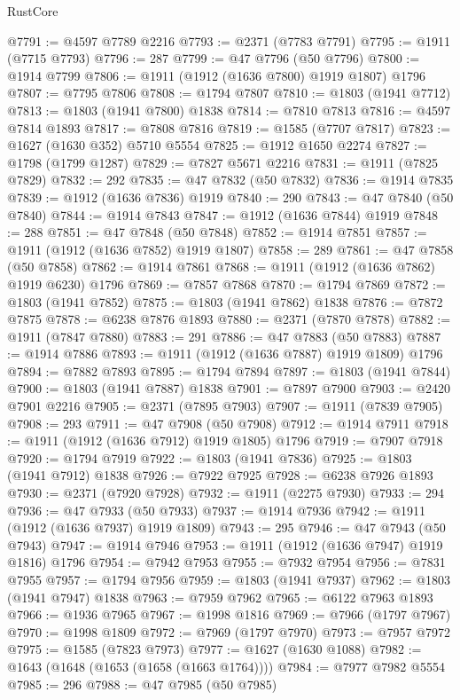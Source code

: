 \begin{lexlean}{RustCore}
\begin{coremodule}
@7791 := @4597 @7789 @2216
@7793 := @2371 (@7783 @7791)
@7795 := @1911 (@7715 @7793)
@7796 := 287
@7799 := @47 @7796 (@50 @7796)
@7800 := @1914 @7799
@7806 := @1911 (@1912 (@1636 @7800) @1919 @1807) @1796
@7807 := @7795 @7806
@7808 := @1794 @7807
@7810 := @1803 (@1941 @7712)
@7813 := @1803 (@1941 @7800) @1838
@7814 := @7810 @7813
@7816 := @4597 @7814 @1893
@7817 := @7808 @7816
@7819 := @1585 (@7707 @7817)
@7823 := @1627 (@1630 @352) @5710 @5554
@7825 := @1912 @1650 @2274
@7827 := @1798 (@1799 @1287)
@7829 := @7827 @5671 @2216
@7831 := @1911 (@7825 @7829)
@7832 := 292
@7835 := @47 @7832 (@50 @7832)
@7836 := @1914 @7835
@7839 := @1912 (@1636 @7836) @1919
@7840 := 290
@7843 := @47 @7840 (@50 @7840)
@7844 := @1914 @7843
@7847 := @1912 (@1636 @7844) @1919
@7848 := 288
@7851 := @47 @7848 (@50 @7848)
@7852 := @1914 @7851
@7857 := @1911 (@1912 (@1636 @7852) @1919 @1807)
@7858 := 289
@7861 := @47 @7858 (@50 @7858)
@7862 := @1914 @7861
@7868 := @1911 (@1912 (@1636 @7862) @1919 @6230) @1796
@7869 := @7857 @7868
@7870 := @1794 @7869
@7872 := @1803 (@1941 @7852)
@7875 := @1803 (@1941 @7862) @1838
@7876 := @7872 @7875
@7878 := @6238 @7876 @1893
@7880 := @2371 (@7870 @7878)
@7882 := @1911 (@7847 @7880)
@7883 := 291
@7886 := @47 @7883 (@50 @7883)
@7887 := @1914 @7886
@7893 := @1911 (@1912 (@1636 @7887) @1919 @1809) @1796
@7894 := @7882 @7893
@7895 := @1794 @7894
@7897 := @1803 (@1941 @7844)
@7900 := @1803 (@1941 @7887) @1838
@7901 := @7897 @7900
@7903 := @2420 @7901 @2216
@7905 := @2371 (@7895 @7903)
@7907 := @1911 (@7839 @7905)
@7908 := 293
@7911 := @47 @7908 (@50 @7908)
@7912 := @1914 @7911
@7918 := @1911 (@1912 (@1636 @7912) @1919 @1805) @1796
@7919 := @7907 @7918
@7920 := @1794 @7919
@7922 := @1803 (@1941 @7836)
@7925 := @1803 (@1941 @7912) @1838
@7926 := @7922 @7925
@7928 := @6238 @7926 @1893
@7930 := @2371 (@7920 @7928)
@7932 := @1911 (@2275 @7930)
@7933 := 294
@7936 := @47 @7933 (@50 @7933)
@7937 := @1914 @7936
@7942 := @1911 (@1912 (@1636 @7937) @1919 @1809)
@7943 := 295
@7946 := @47 @7943 (@50 @7943)
@7947 := @1914 @7946
@7953 := @1911 (@1912 (@1636 @7947) @1919 @1816) @1796
@7954 := @7942 @7953
@7955 := @7932 @7954
@7956 := @7831 @7955
@7957 := @1794 @7956
@7959 := @1803 (@1941 @7937)
@7962 := @1803 (@1941 @7947) @1838
@7963 := @7959 @7962
@7965 := @6122 @7963 @1893
@7966 := @1936 @7965
@7967 := @1998 @1816
@7969 := @7966 (@1797 @7967)
@7970 := @1998 @1809
@7972 := @7969 (@1797 @7970)
@7973 := @7957 @7972
@7975 := @1585 (@7823 @7973)
@7977 := @1627 (@1630 @1088)
@7982 := @1643 (@1648 (@1653 (@1658 (@1663 @1764))))
@7984 := @7977 @7982 @5554
@7985 := 296
@7988 := @47 @7985 (@50 @7985)

\end{coremodule}
\end{lexlean}
